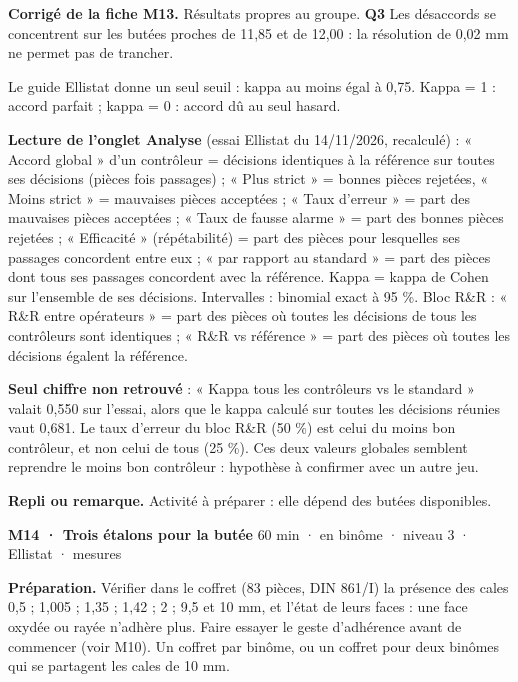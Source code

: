 \textbf{\color{ok}Corrigé de la fiche M13.} Résultats propres au groupe. \textbf{Q3} Les désaccords se concentrent sur les butées proches de 11,85 et de 12,00 : la résolution de 0,02 mm ne permet pas de trancher.\par Le guide Ellistat donne un seul seuil : kappa au moins égal à 0,75. Kappa = 1 : accord parfait ; kappa = 0 : accord dû au seul hasard.\par \textbf{Lecture de l'onglet Analyse} (essai Ellistat du 14/11/2026, recalculé) : « Accord global » d'un contrôleur = décisions identiques à la référence sur toutes ses décisions (pièces fois passages) ; « Plus strict » = bonnes pièces rejetées, « Moins strict » = mauvaises pièces acceptées ; « Taux d'erreur » = part des mauvaises pièces acceptées ; « Taux de fausse alarme » = part des bonnes pièces rejetées ; « Efficacité » (répétabilité) = part des pièces pour lesquelles ses passages concordent entre eux ; « par rapport au standard » = part des pièces dont tous ses passages concordent avec la référence. Kappa = kappa de Cohen sur l'ensemble de ses décisions. Intervalles : binomial exact à 95 \%. Bloc R\&R : « R\&R entre opérateurs » = part des pièces où toutes les décisions de tous les contrôleurs sont identiques ; « R\&R vs référence » = part des pièces où toutes les décisions égalent la référence.\par \textbf{Seul chiffre non retrouvé} : « Kappa tous les contrôleurs vs le standard » valait 0,550 sur l'essai, alors que le kappa calculé sur toutes les décisions réunies vaut 0,681. Le taux d'erreur du bloc R\&R (50 \%) est celui du moins bon contrôleur, et non celui de tous (25 \%). Ces deux valeurs globales semblent reprendre le moins bon contrôleur : hypothèse à confirmer avec un autre jeu.\par
{\small\textbf{Repli ou remarque.} Activité à préparer : elle dépend des butées disponibles.}\par
\vspace{3pt}
\begin{tcolorbox}[act]\textbf{M14 · Trois étalons pour la butée} \hfill {\small 60 min · en binôme · niveau 3 · Ellistat · mesures}\end{tcolorbox}
\textbf{Préparation.} Vérifier dans le coffret (83 pièces, DIN 861/I) la présence des cales 0,5 ; 1,005 ; 1,35 ; 1,42 ; 2 ; 9,5 et 10 mm, et l'état de leurs faces : une face oxydée ou rayée n'adhère plus. Faire essayer le geste d'adhérence avant de commencer (voir M10). Un coffret par binôme, ou un coffret pour deux binômes qui se partagent les cales de 10 mm.\par
